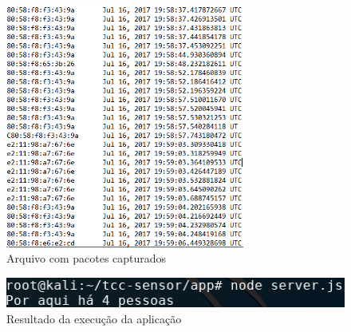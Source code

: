 \begin{figure}[!h]
  \caption{\label{arquivo-pacotes}Arquivo com pacotes capturados}
  \begin{center}
    \includegraphics[width=0.70\textwidth]{img/packets.png}
  \end{center}
\end{figure}

\begin{figure}[!h]
  \caption{\label{exec-bash}Resultado da execução da aplicação}
  \begin{center}
    \includegraphics[width=1.0\textwidth]{img/bash.png}
  \end{center}
\end{figure}
